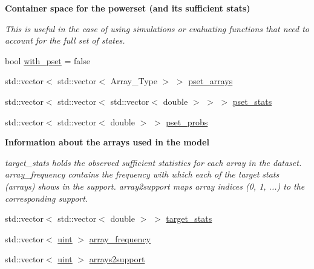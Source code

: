 \begin{Indent}\textbf{ Container space for the powerset (and its sufficient stats)}\par
{\em This is useful in the case of using simulations or evaluating functions that need to account for the full set of states. }\begin{DoxyCompactItemize}
\item 
bool \hyperlink{classbarry_1_1_model_a08c74ccd0aa76906f724ccb5e36d0762}{with\+\_\+pset} = false
\item 
std\+::vector$<$ std\+::vector$<$ Array\+\_\+\+Type $>$ $>$ \hyperlink{classbarry_1_1_model_ae5aad2049cc19ee36e9c2cfefd65a0dd}{pset\+\_\+arrays}
\item 
std\+::vector$<$ std\+::vector$<$ std\+::vector$<$ double $>$ $>$ $>$ \hyperlink{classbarry_1_1_model_a3763f129965942611eb58e9779336f34}{pset\+\_\+stats}
\item 
std\+::vector$<$ std\+::vector$<$ double $>$ $>$ \hyperlink{classbarry_1_1_model_a4ccabb6842238fa5c7ff3476ef760423}{pset\+\_\+probs}
\end{DoxyCompactItemize}
\end{Indent}
\begin{Indent}\textbf{ Information about the arrays used in the model}\par
{\em {\ttfamily target\+\_\+stats} holds the observed sufficient statistics for each array in the dataset. {\ttfamily array\+\_\+frequency} contains the frequency with which each of the target stats (arrays) shows in the support. {\ttfamily array2support} maps array indices (0, 1, ...) to the corresponding support. }\begin{DoxyCompactItemize}
\item 
std\+::vector$<$ std\+::vector$<$ double $>$ $>$ \hyperlink{classbarry_1_1_model_ab2a0fde37b6a6da5a5faffcd24ec4c27}{target\+\_\+stats}
\item 
std\+::vector$<$ \hyperlink{namespacebarry_a11dfc53ddb4672278319aa04f1e09a6c}{uint} $>$ \hyperlink{classbarry_1_1_model_a64041df6ecac9aface20f9d13c0b22eb}{array\+\_\+frequency}
\item 
std\+::vector$<$ \hyperlink{namespacebarry_a11dfc53ddb4672278319aa04f1e09a6c}{uint} $>$ \hyperlink{classbarry_1_1_model_a9cd0e9c9d29df6637ab30ebe3daeeff7}{arrays2support}
\end{DoxyCompactItemize}
\end{Indent}
